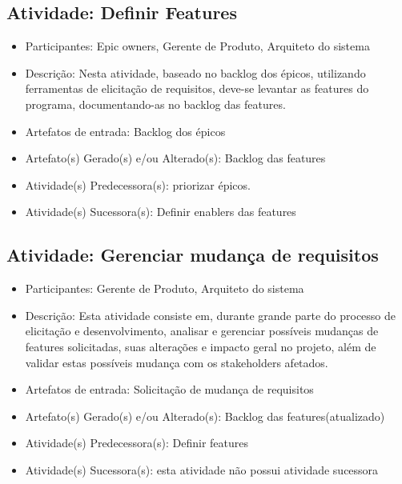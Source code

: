 
\subsection{Atividade: Definir Features}
\begin{itemize}
\item Participantes: Epic owners, Gerente de Produto, Arquiteto do sistema

\item Descrição: Nesta atividade, baseado no backlog dos épicos, utilizando ferramentas de elicitação de requisitos, deve-se levantar as features do programa, documentando-as no backlog das features.

\item Artefatos de entrada: Backlog dos épicos

\item Artefato(s) Gerado(s) e/ou Alterado(s): Backlog das features

\item Atividade(s) Predecessora(s): priorizar épicos.
  
\item Atividade(s) Sucessora(s): Definir enablers das features
\end{itemize}

\subsection{Atividade: Gerenciar mudança de requisitos}
\begin{itemize}
\item Participantes: Gerente de Produto, Arquiteto do sistema

\item Descrição: Esta atividade consiste em, durante grande parte do processo de elicitação e desenvolvimento, analisar e gerenciar possíveis mudanças de features solicitadas, suas alterações e impacto geral no projeto, além de validar estas possíveis mudança com os stakeholders afetados.
\item Artefatos de entrada: Solicitação de mudança de requisitos

\item Artefato(s) Gerado(s) e/ou Alterado(s): Backlog das features(atualizado) 

\item Atividade(s) Predecessora(s): Definir features
  
\item Atividade(s) Sucessora(s): esta atividade não possui atividade sucessora
\end{itemize}

